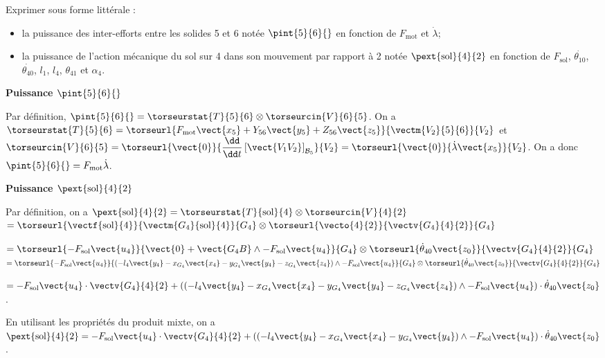\documentclass[11pt]{article}
\begin{document}
\UPSTIquestion  Exprimer sous forme littérale :
\begin{itemize}
\item la puissance des inter-efforts entre les solides 5 et 6 notée $\pint{5}{6}{}$ en fonction de $F_{\text{mot}}$ et $\dot{\lambda}$;
\item la puissance de l’action mécanique du sol sur 4 dans son mouvement par rapport à 2 notée $\pext{\text{sol}}{4}{2}$ en fonction de $F_{\text{sol}}$, $\dot{\theta_{10}}$, $\dot{\theta_{40}}$, $l_1$, $l_4$, $\theta_{41}$ et $\alpha_4$.
\end{itemize}

\begin{UPSTIcorrige}
\textbf{Puissance $\pint{5}{6}{}$}

Par définition, $\pint{5}{6}{} = \torseurstat{T}{5}{6}\otimes \torseurcin{V}{6}{5}$. On a 
$ \torseurstat{T}{5}{6} = \torseurl{F_{\text{mot}}\vect{x_5} + Y_{56}\vect{y_5}+ Z_{56}\vect{z_5}}{\vectm{V_2}{5}{6}}{V_2}$
et 
$\torseurcin{V}{6}{5} = 
\torseurl{\vect{0}}{
\dfrac{\dd }{\dd t}\left[\vect{V_1V_2}\right]_{\mathcal{B}_5}
}{V_2}=\torseurl{\vect{0}}{\dot{\lambda}\vect{x_5}}{V_2}$.
On a donc $\pint{5}{6}{} =F_{\text{mot}}\dot{\lambda}$. 

\textbf{Puissance $\pext{\text{sol}}{4}{2}$}

Par définition, on a $\pext{\text{sol}}{4}{2} = \torseurstat{T}{\text{sol}}{4} \otimes \torseurcin{V}{4}{2}$
$ = \torseurl{\vectf{\text{sol}}{4}}{\vectm{G_4}{\text{sol}}{4}}{G_4} \otimes \torseurl{\vecto{4}{2}}{\vectv{G_4}{4}{2}}{G_4}$

$ = \torseurl{-F_{\text{sol}}\vect{u_4}}{\vect{0} + \vect{G_4 B} \wedge -F_{\text{sol}}\vect{u_4}  }{G_4} \otimes \torseurl{\dot{\theta}_{40}\vect{z_0}}{\vectv{G_4}{4}{2}}{G_4} $ 
$ = \torseurl{-F_{\text{sol}}\vect{u_4}}{\left( -l_4 \vect{y_4} -  x_{G_4} \vect{x_4}- y_{G_4} \vect{y_4}- z_{G_4} \vect{z_4} \right)\wedge -F_{\text{sol}}\vect{u_4}  }{G_4} \otimes \torseurl{\dot{\theta}_{40}\vect{z_0}}{\vectv{G_4}{4}{2}}{G_4} $ 

$
=-F_{\text{sol}}\vect{u_4} \cdot \vectv{G_4}{4}{2} + \left(\left( -l_4 \vect{y_4} -  x_{G_4} \vect{x_4}- y_{G_4} \vect{y_4}- z_{G_4} \vect{z_4} \right)\wedge -F_{\text{sol}}\vect{u_4}  \right)\cdot \dot{\theta}_{40}\vect{z_0}
$. 

En utilisant les propriétés du produit mixte, on a 
$
\pext{\text{sol}}{4}{2} =-F_{\text{sol}}\vect{u_4} \cdot \vectv{G_4}{4}{2} + \left(\left( -l_4 \vect{y_4} -  x_{G_4} \vect{x_4}- y_{G_4} \vect{y_4}\right)\wedge -F_{\text{sol}}\vect{u_4}  \right)\cdot \dot{\theta}_{40}\vect{z_0}
$.


\end{UPSTIcorrige}
\end{document}
